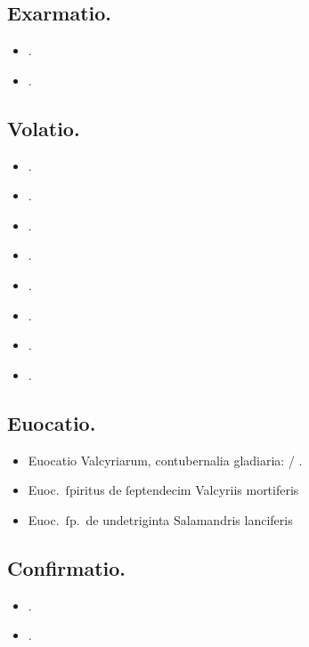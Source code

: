 \documentclass[12pt]{book}
\begin{document}
\subsection{Exarmatio.}\label{exarmatio}

\begin{itemize}
  \item {}.
  \item {}.
\end{itemize}

\subsection{Volatio.}\label{volatio}

\begin{itemize}
  \item {}.
  \item {}.
  \item {}.
  \item {}.
  \item {}.
  \item {}.
  \item {}.
  \item {}.
\end{itemize}

\subsection{Euocatio.}\label{evocatio}

\begin{itemize}
  \item Euocatio Valcyriarum, contubernalia gladiaria:  / .
  \item Euoc.~ſpiritus de ſeptendecim Valcyriis mortiferis \textelp{}
  \item Euoc.~ſp.~de undetriginta Salamandris lanciferis \textelp{}
\end{itemize}

\subsection{Confirmatio.}\label{confirmatio}
\begin{itemize}
  \item {}.
  \item {}.
\end{itemize}
\end{document}
